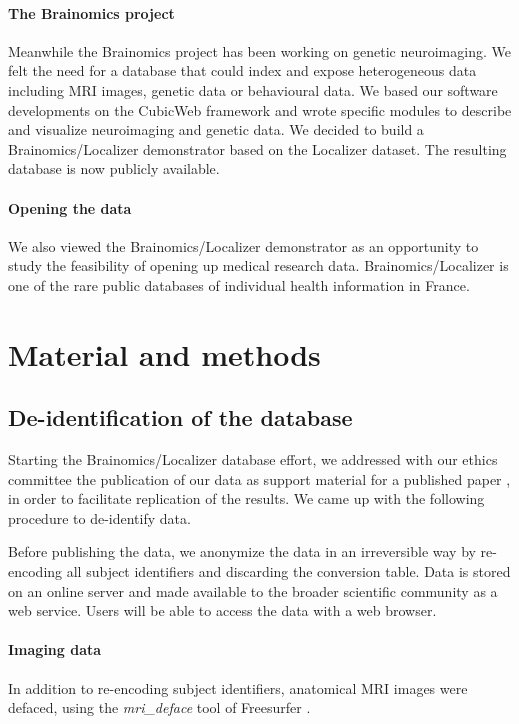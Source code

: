 \documentclass[review]{elsarticle}
\begin{document}
\paragraph{The Brainomics project} Meanwhile the Brainomics project has been working on genetic neuroimaging. We felt the need for a database that could index and expose heterogeneous data including MRI images, genetic data or behavioural data. We based our software developments on the CubicWeb framework and wrote specific modules to describe and visualize neuroimaging and genetic data. We decided to build a Brainomics/Localizer demonstrator based on the Localizer dataset. The resulting database is now publicly available.

\paragraph{Opening the data} We also viewed the Brainomics/Localizer demonstrator
as an opportunity  to study the feasibility of opening up medical research data.
Brainomics/Localizer is one of the rare public databases of individual health information
in France.


\section{Material and methods}

\subsection{De-identification of the database}

Starting the Brainomics/Localizer database effort, we addressed with our ethics
committee the publication of our data as support material for a published
paper \cite{Pinel2012}, in order to facilitate replication of the results. We came
up with the following procedure to de-identify data.

Before publishing the data, we anonymize the data in an irreversible way by
re-encoding all subject identifiers and discarding the conversion table. Data
is stored on an online server and made available to the broader scientific
community as a web service. Users will be able to access the data with a web
browser.

\paragraph{Imaging data} In addition to re-encoding subject identifiers,
anatomical MRI images were defaced, using the \textit{mri\_deface} tool of
Freesurfer \cite{Fischl2012}.
\end{document}
